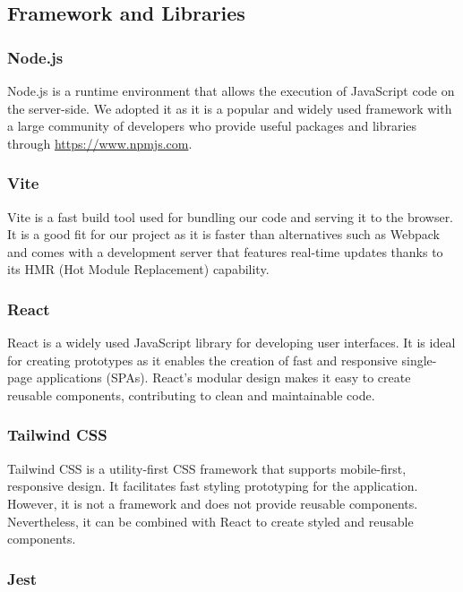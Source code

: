 \subsection{Framework and Libraries}

\subsubsection{Node.js}

Node.js is a runtime environment that allows the execution of JavaScript code on the server-side. We adopted it as it is a popular and widely used framework with a large community of developers who provide useful packages and libraries through \url{https://www.npmjs.com}.

\subsubsection{Vite}

Vite is a fast build tool used for bundling our code and serving it to the browser. It is a good fit for our project as it is faster than alternatives such as Webpack and comes with a development server that features real-time updates thanks to its HMR (Hot Module Replacement) capability.

\subsubsection{React}

React is a widely used JavaScript library for developing user interfaces. It is ideal for creating prototypes as it enables the creation of fast and responsive single-page applications (SPAs). React's modular design makes it easy to create reusable components, contributing to clean and maintainable code.

\subsubsection{Tailwind CSS}

Tailwind CSS is a utility-first CSS framework that supports mobile-first, responsive design. It facilitates fast styling prototyping for the application. However, it is not a framework and does not provide reusable components. Nevertheless, it can be combined with React to create styled and reusable components.

\subsubsection{Jest}

